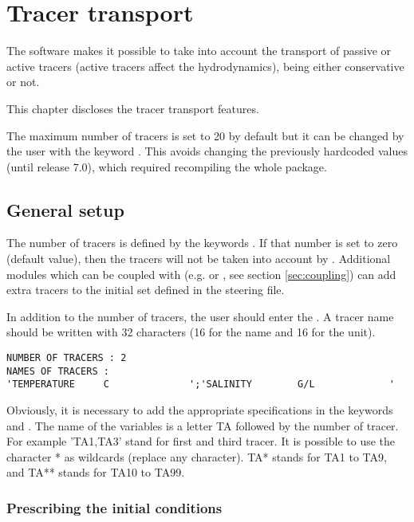 \chapter{Tracer transport}

The  software makes it possible to take into account the transport of
passive or active tracers (active tracers affect the hydrodynamics), being
either conservative or not.

This chapter discloses the tracer transport features.

The maximum number of tracers is set to 20 by default but it can be changed by
the user with the keyword .
This avoids changing the previously hardcoded values (until release 7.0),
which required recompiling the whole package.

\section{General setup}

The number of tracers is defined by the keywords . If
that number is set to zero (default value), then the tracers will not be taken
into account by .
Additional modules which can be coupled with 
(e.g. \waqtel or \gaia, see section \ref{sec:coupling})
can add extra tracers to the initial set defined in the 
steering file.

In addition to the number of tracers, the user should enter the . A tracer name should be written with 32 characters
(16 for the name and 16 for the unit).

\begin{lstlisting}[language=TelemacCas]
NUMBER OF TRACERS : 2
NAMES OF TRACERS :
'TEMPERATURE     C              ';'SALINITY        G/L             '
\end{lstlisting}

Obviously, it is necessary to add the appropriate specifications
in the keywords  and
.
The name of the variables is a letter TA followed by the number of tracer.
For example 'TA1,TA3' stand for first and third tracer.
It is possible to use the character * as wildcards (replace any character).
TA* stands for TA1 to TA9, and TA** stands for TA10 to TA99.


\subsection{Prescribing the initial conditions}

